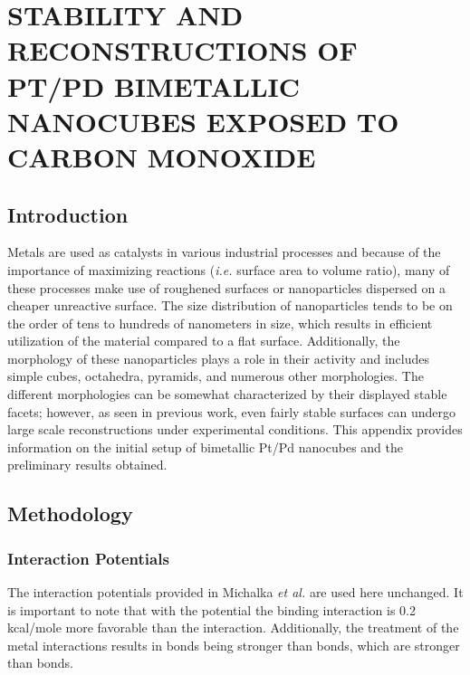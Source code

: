 
\chapter{STABILITY AND RECONSTRUCTIONS OF PT/PD BIMETALLIC NANOCUBES EXPOSED TO CARBON MONOXIDE}
\label{app:cube}

\section{Introduction}

Metals are used as catalysts in various industrial processes and because of the
importance of maximizing reactions ({\em i.e.} surface area to volume ratio),
many of these processes make use of roughened surfaces or nanoparticles
dispersed on a cheaper unreactive surface.\citep{Munnik:2015qf, Graham:2007ng}
The size distribution of nanoparticles tends to be on the order of tens to
hundreds of nanometers in size, which results in efficient utilization of the
material compared to a flat surface.\citep{Zhang:2011ne, Liu:2013hf}
Additionally, the morphology of these nanoparticles plays a role in their
activity and includes simple cubes, octahedra, pyramids, and numerous other
morphologies.\citep{Ahmadi:2015os, Wang:2015qb, Wang:2016dg} The different
morphologies can be somewhat characterized by their displayed stable facets;
however, as seen in previous work\citep{Tao:2010aa, Michalka:2013aa,
Michalka:2015aa, Kim:2016cr}, even fairly stable surfaces can undergo large
scale reconstructions under experimental conditions. This appendix provides
information on the initial setup of bimetallic Pt/Pd nanocubes and the
preliminary results obtained. 

\section{Methodology}
\subsection{Interaction Potentials}
The interaction potentials provided in Michalka {\em et
al.}\citep{Michalka:2015aa} are used here unchanged. It is important to note
that with the potential the  binding interaction is 0.2
kcal/mole more favorable than the  interaction. Additionally,
the treatment of the metal interactions results in  bonds
being stronger than  bonds, which are stronger than
 bonds.

